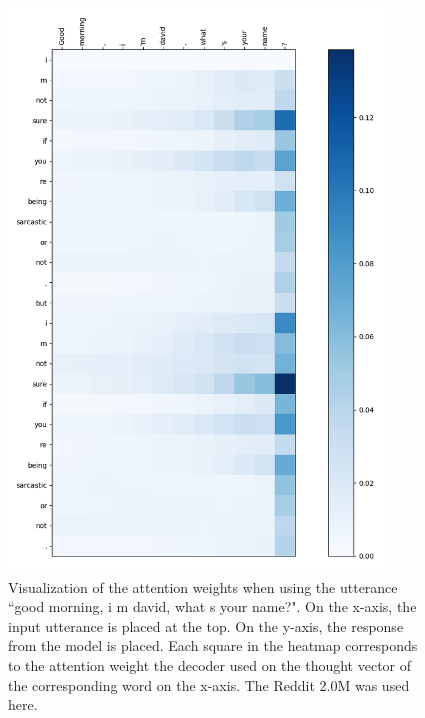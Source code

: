 \begin{figure}[H]
	\centering
	\includegraphics[width=10cm]{img/attention/attention_visualization1_reddit_2m.png}
	\caption{Visualization of the attention weights when using the utterance ``good morning, i m david, what s your name?". On the x-axis, the input utterance is placed at the top. On the y-axis, the response from the model is placed. Each square in the heatmap corresponds to the attention weight the decoder used on the thought vector of the corresponding word on the x-axis. The Reddit 2.0M was used here.}
	\label{results:attention:example1:reddit}
\end{figure}

